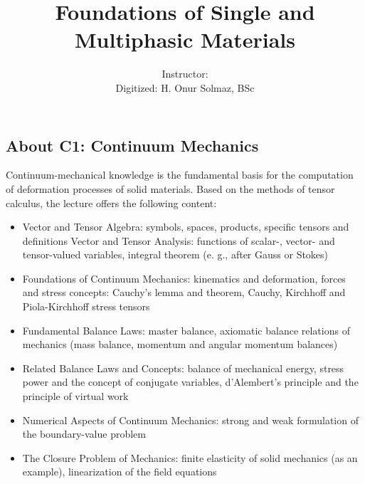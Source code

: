 \documentclass[a5paper,twosided,11pt,DIV=15,BCOR=0mm]{scrbook}
\title{Foundations of Single and Multiphasic Materials}
\author{Instructor: \\Digitized: H. Onur Solmaz, BSc}
\begin{document}
%
\maketitle
\tableofcontents
\newpage
{\footnotesize
\subsection*{About C1: Continuum Mechanics}
Continuum-mechanical knowledge is the fundamental basis for the computation of
deformation processes of solid materials. Based on the methods of tensor
calculus, the lecture offers the following content:
%
\begin{itemize}
\item Vector and Tensor Algebra: symbols, spaces, products, specific
  tensors and definitions Vector and Tensor Analysis: functions of scalar-,
  vector- and tensor-valued variables, integral theorem (e. g., after Gauss or
  Stokes)
\item Foundations of Continuum Mechanics: kinematics and deformation, forces and
  stress concepts: Cauchy’s lemma and theorem, Cauchy, Kirchhoff and
  Piola-Kirchhoff stress tensors
\item Fundamental Balance Laws: master balance, axiomatic balance relations of
  mechanics (mass balance, momentum and angular momentum balances)
\item Related Balance Laws and Concepts: balance of mechanical energy, stress
  power and the concept of conjugate variables, d’Alembert’s principle and the
  principle of virtual work
\item Numerical Aspects of Continuum Mechanics: strong and weak formulation of
  the boundary-value problem
\item The Closure Problem of Mechanics: finite elasticity of solid mechanics (as
  an example), linearization of the field equations
\end{itemize}
}
\end{document}
